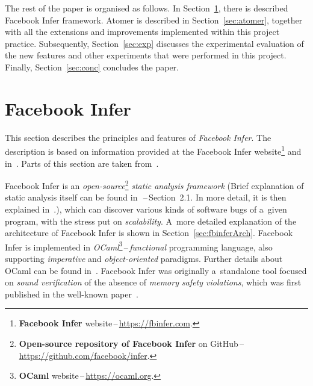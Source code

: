 The rest of the paper is organised as follows. In Section~\ref{sec:fbinfer},
there is described Facebook Infer framework. Atomer is described in
Section~\ref{sec:atomer}, together with all the extensions and improvements
implemented within this project practice. Subsequently,
Section~\ref{sec:exp} discusses the experimental evaluation of the new
features and other experiments that were performed in this project.
Finally, Section~\ref{sec:conc} concludes the paper.


\section{Facebook Infer}
\label{sec:fbinfer}

This section describes the principles and features of \emph{Facebook Infer}.
The description is based on information provided at the Facebook Infer
website\footnote{\textbf{Facebook Infer}
website\,--\,\url{https://fbinfer.com}.} and
in~\cite{projectPracticeMarcin2018}. Parts of this section are taken
from~\cite{harmimBP, excel2019FBInfer}.

Facebook Infer is an \emph{open-source}\footnote{\textbf{Open-source repository
of Facebook Infer} on GitHub\,--\,\url{https://github.com/facebook/infer}.}
\emph{static analysis framework} (Brief explanation of static analysis itself
can be found in~\cite{harmimBP}\,--\,Section~2.1. In more detail, it is then
explained in~\cite{staticAnalysisMoller, favStaticAnalysis}.), which can
discover various kinds of software bugs of a~given program, with the stress
put on \emph{scalability}. A~more detailed explanation of the architecture of
Facebook Infer is shown in Section~\ref{sec:fbinferArch}. Facebook Infer is
implemented in \emph{OCaml}\footnote{\textbf{OCaml}
website\,--\,\url{https://ocaml.org}.}\,--\,\emph{functional} programming
language, also supporting \emph{imperative} and \emph{object-oriented}
paradigms. Further details about OCaml can be found in~\cite{realWorldOCaml}.
Facebook Infer was originally a~standalone tool focused on \emph{sound
verification} of the absence of \emph{memory safety violations}, which was
first published in the well-known paper~\cite{inferBiabduction}.

